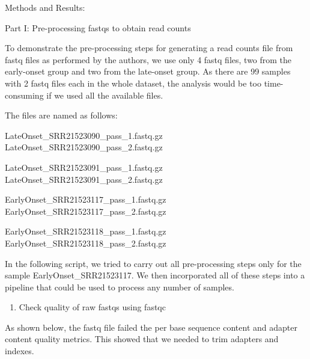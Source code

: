 \documentclass[
]{article}
\newenvironment{Shaded}{\begin{snugshade}}{\end{snugshade}}
\newcommand{\AttributeTok}[1]{\textcolor[rgb]{0.77,0.63,0.00}{#1}}
\newcommand{\ExtensionTok}[1]{#1}
\newcommand{\NormalTok}[1]{#1}
\newcommand{\OperatorTok}[1]{\textcolor[rgb]{0.81,0.36,0.00}{\textbf{#1}}}
\newcommand{\StringTok}[1]{\textcolor[rgb]{0.31,0.60,0.02}{#1}}
\newcommand{\VariableTok}[1]{\textcolor[rgb]{0.00,0.00,0.00}{#1}}
\providecommand{\tightlist}{%
  \setlength{\itemsep}{0pt}\setlength{\parskip}{0pt}}
\begin{document}
Methods and Results:

Part I: Pre-processing fastqs to obtain read counts

To demonstrate the pre-processing steps for generating a read counts
file from fastq files as performed by the authors, we use only 4 fastq
files, two from the early-onset group and two from the late-onset group.
As there are 99 samples with 2 fastq files each in the whole dataset,
the analysis would be too time-consuming if we used all the available
files.

The files are named as follows:

LateOnset\_SRR21523090\_pass\_1.fastq.gz
LateOnset\_SRR21523090\_pass\_2.fastq.gz

LateOnset\_SRR21523091\_pass\_1.fastq.gz
LateOnset\_SRR21523091\_pass\_2.fastq.gz

EarlyOnset\_SRR21523117\_pass\_1.fastq.gz
EarlyOnset\_SRR21523117\_pass\_2.fastq.gz

EarlyOnset\_SRR21523118\_pass\_1.fastq.gz
EarlyOnset\_SRR21523118\_pass\_2.fastq.gz

In the following script, we tried to carry out all pre-processing steps
only for the sample EarlyOnset\_SRR21523117. We then incorporated all of
these steps into a pipeline that could be used to process any number of
samples.

\begin{enumerate}
\def\labelenumi{\arabic{enumi}.}
\tightlist
\item
  Check quality of raw fastqs using fastqc
\end{enumerate}

\begin{Shaded}
\end{Shaded}

As shown below, the fastq file failed the per base sequence content and
adapter content quality metrics. This showed that we needed to trim
adapters and indexes.
\end{document}
